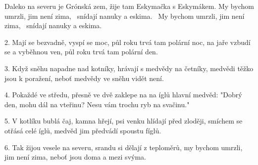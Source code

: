 \resetVars
{}
\MakeHeader
\Lyrics

Daleko na severu je Grónská zem,
žije tam Eskymačka s Eskymákem.
My bychom umrzli, jim není zima,~
snídají nanuky a eskima.~
My bychom umrzli, jim není zima,~
snídají nanuky a eskima.~

2. Mají se bezvadně, vyspí se moc,
půl roku trvá tam polární noc,
na jaře vzbudí se a vyběhnou ven,
půl roku trvá tam polární den.

3. Když sněhu napadne nad kotníky,
hrávají s medvědy na četníky,
medvědi těžko jsou k poražení,
neboť medvědy ve sněhu vidět není.

4. Pokaždé ve středu, přesně ve dvě
zaklepe na na íglů hlavní medvěd:
"Dobrý den, mohu dál na vteřinu?
Nesu vám trochu ryb na svačinu."

5. V kotlíku bublá čaj, kamna hřejí,
psi venku hlídají před zloději,
smíchem se otřásá celé íglů,
medvěd jim předvádí spoustu fíglů.

6. Tak žijou vesele na severu,
srandu si dělají z teploměrů,
my bychom umrzli, jim není zima,
neboť jsou doma a mezi svýma.

\Next

